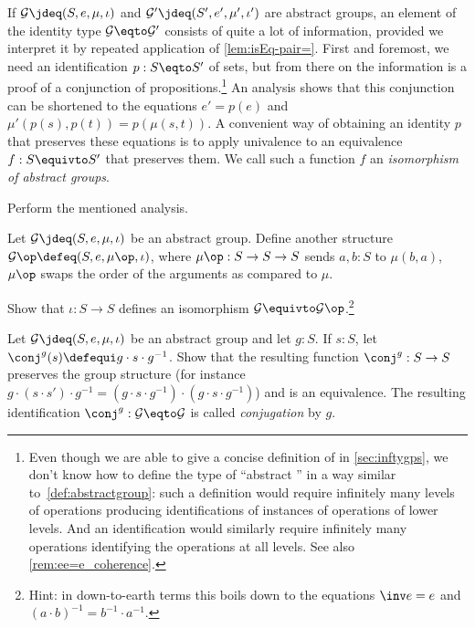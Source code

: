 \begin{remark}
  If $\mathcal G\jdeq (S,e,\mu,\iota)$ and $\mathcal G'\jdeq(S',e',\mu',\iota')$
  are abstract groups, an element of the identity type
  $\mathcal G\eqto\mathcal G'$ consists of quite a lot of information,
  provided we interpret it by repeated application of \cref{lem:isEq-pair=}.
  First and foremost, we need an identification $p:S\eqto S'$ of sets, but
  from there on the information is a proof of a conjunction of propositions.\footnote{%
    Even though we are able to give a concise definition of \inftygps 
    in \cref{sec:inftygps}, we don't know how to define
    the type of ``abstract \inftygps'' in a way similar
    to~\cref{def:abstractgroup}:
    such a definition would require infinitely many 
    levels of operations producing
    identifications of instances of operations of lower levels.
    And an identification would similarly require infinitely
    many operations identifying the operations at all levels.
    See also \cref{rem:ee=e_coherence}.}
  An analysis shows that this conjunction can be shortened to the equations $e'=p(e)$ and
  $\mu'(p(s),p(t))=p(\mu(s,t))$.  A convenient way of obtaining an identity $p$ that preserves these equations is to apply univalence to an
  equivalence $f: S \equivto S'$ that preserves them.
  We call such a function $f$ an \emph{isomorphism of abstract groups}.%
\end{remark}

\begin{xca}
  Perform the mentioned analysis.
\end{xca}

\begin{xca}
  \label{xca:op-abs-group}
  Let $\mathcal G \jdeq (S,e,\mu,\iota)$ be an abstract group.
  Define another structure $\mathcal G\op \defeq (S,e,\mu\op,\iota)$,
  where $\mu\op : S \to S \to S$ sends $a,b:S$ to $\mu(b,a)$,
  \ie $\mu\op$ swaps the order of the arguments as compared to $\mu$.

  Show that $\iota : S \to S$ defines an isomorphism 
  $\mathcal G \equivto \mathcal G\op$.\footnote{%
  Hint: in down-to-earth terms this boils down to the equations
  $\inv e = e$ and $(a\cdot b)^{-1} = b^{-1}\cdot a^{-1}$.}
\end{xca}

\begin{xca}
  \label{xca:conj}
  Let $\mathcal G\jdeq(S,e,\mu,\iota)$ be an abstract group and let $g:S$.  If $s:S$, let $\conj^g(s)\defequi g\cdot s\cdot g^{-1}$.  Show that the resulting function $\conj^g:S\to S$ preserves the group structure (for instance $g\cdot(s\cdot s')\cdot g^{-1}=(g\cdot s\cdot g^{-1} )\cdot(g\cdot s\cdot g^{-1})$) and is an equivalence.  The resulting identification $\conj^g:\mathcal G\eqto\mathcal G$ is called \emph{conjugation} by $g$.
\end{xca}

